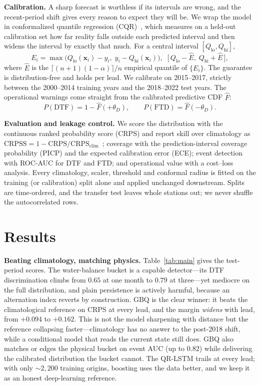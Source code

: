 \documentclass[conference]{IEEEtran}
\begin{document}
\textbf{Calibration.} A sharp forecast is worthless if its intervals are wrong, and the recent-period
shift gives every reason to expect they will be. We wrap the model in conformalized quantile regression
(CQR)~\cite{romano2019}, which measures on a held-out calibration set how far reality falls outside each
predicted interval and then widens the interval by exactly that much. For a central interval
$[Q_{\mathrm{lo}},Q_{\mathrm{hi}}]$,
\begin{equation}
E_i=\max\!\big(Q_{\mathrm{lo}}(\mathbf{x}_i)-y_i,\;y_i-Q_{\mathrm{hi}}(\mathbf{x}_i)\big),\;\;
\big[\,Q_{\mathrm{lo}}-\hat{E},\;Q_{\mathrm{hi}}+\hat{E}\,\big],
\label{eq:cqr}
\end{equation}
where $\hat{E}$ is the $\lceil(n{+}1)(1{-}\alpha)\rceil/n$ empirical quantile of $\{E_i\}$. The guarantee
is distribution-free and holds per lead. We calibrate on 2015--2017, strictly between the 2000--2014
training years and the 2018--2022 test years. The operational warnings come straight from the calibrated
predictive CDF $\hat{F}$:
\begin{equation}
P(\mathrm{DTF})=1-\hat{F}(+\theta_D),\qquad P(\mathrm{FTD})=\hat{F}(-\theta_D).
\label{eq:event}
\end{equation}

\textbf{Evaluation and leakage control.} We score the distribution with the continuous ranked
probability score (CRPS) and report skill over climatology as $\mathrm{CRPSS}=1-\mathrm{CRPS}/
\mathrm{CRPS}_{\mathrm{clim}}$~\cite{gneiting2007}; coverage with the prediction-interval coverage
probability (PICP) and the expected calibration error (ECE); event detection with ROC-AUC for DTF and
FTD; and operational value with a cost--loss analysis. Every climatology, scaler, threshold and
conformal radius is fitted on the training (or calibration) split alone and applied unchanged
downstream. Splits are time-ordered, and the transfer test leaves whole stations out; we never shuffle
the autocorrelated rows.

\section{Results}
\textbf{Beating climatology, matching physics.} Table~\ref{tab:main} gives the test-period scores. The
water-balance bucket is a capable detector---its DTF discrimination climbs from $0.65$ at one month to
$0.79$ at three---yet mediocre on the full distribution, and plain persistence is actively harmful,
because an alternation index reverts by construction. GBQ is the clear winner: it beats the
climatological reference on CRPS at every lead, and the margin \emph{widens} with lead, from $+0.094$ to
$+0.162$. This is not the model sharpening with distance but the reference collapsing faster---climatology
has no answer to the post-2018 shift, while a conditional model that reads the current state still does.
GBQ also matches or edges the physical bucket on event AUC (up to $0.82$) while delivering the calibrated
distribution the bucket cannot. The QR-LSTM trails at every lead; with only $\sim\!2{,}200$ training
origins, boosting uses the data better, and we keep it as an honest deep-learning reference.
\end{document}
